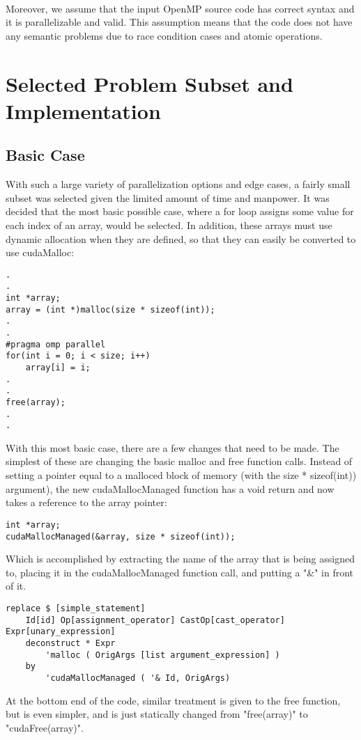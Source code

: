 \documentclass{article}
\begin{document}
\paragraph{}
Moreover, we assume that the input OpenMP source code has correct syntax and it is parallelizable and valid. This assumption means that the code does not have any semantic problems due to race condition cases and atomic operations.

\section{Selected Problem Subset and Implementation}
\subsection{Basic Case}
With such a large variety of parallelization options and edge cases, a fairly small subset was selected given the limited amount of time and manpower. It was decided that the most basic possible case, where a for loop assigns some value for each index of an array, would be selected. In addition, these arrays must use dynamic allocation when they are defined, so that they can easily be converted to use cudaMalloc:

\begin{lstlisting}
.
.
int *array;
array = (int *)malloc(size * sizeof(int));
.
.
#pragma omp parallel
for(int i = 0; i < size; i++)
	array[i] = i;
.
.
free(array);
.
.

\end{lstlisting}

With this most basic case, there are a few changes that need to be made. The simplest of these are changing the basic malloc and free function calls. Instead of setting a pointer equal to a malloced block of memory (with the size * sizeof(int)) argument), the new cudaMallocManaged function has a void return and now takes a reference to the array pointer:
\begin{lstlisting}
int *array;
cudaMallocManaged(&array, size * sizeof(int));
\end{lstlisting}

Which is accomplished by extracting the name of the array that is being assigned to, placing it in the cudaMallocManaged function call, and putting a "\&" in front of it.

\begin{lstlisting}
replace $ [simple_statement]
	Id[id] Op[assignment_operator] CastOp[cast_operator] Expr[unary_expression]
	deconstruct * Expr
		'malloc ( OrigArgs [list argument_expression] )		
	by
		'cudaMallocManaged ( '& Id, OrigArgs)
\end{lstlisting}
At the bottom end of the code, similar treatment is given to the free function, but is even simpler, and is just statically changed from "free(array)" to "cudaFree(array)".
\end{document}
